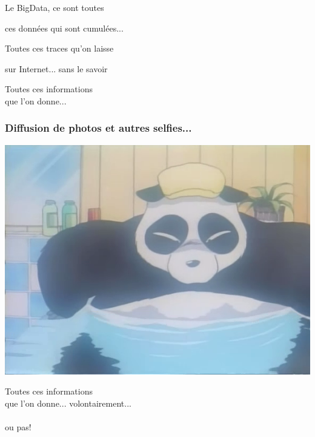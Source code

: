\documentclass{beamer}
\begin{document}
\begin{frame}
\Huge{\centerline{Le BigData, ce sont toutes}}
\Huge{\centerline{ces données qui sont cumulées...}}
\end{frame}

\begin{frame}
\Huge{\centerline{Toutes ces traces qu'on laisse}}
\Huge{\centerline{sur Internet... sans le savoir}}
\end{frame}

\begin{frame}
\begin{center}
\Huge{Toutes ces informations \\ que l'on donne... }
\end{center}
\end{frame}

\begin{frame}
\frametitle{Diffusion de photos et autres selfies...}
\begin{center}
\includegraphics[scale=0.5] {./images/Leak02.png} 
\end{center}
\end{frame}

\begin{frame}
\begin{center}
\Huge{Toutes ces informations \\ que l'on donne... }
\Huge{volontairement...\\~\\ou pas!}
\end{center}
\end{frame}
\end{document}
